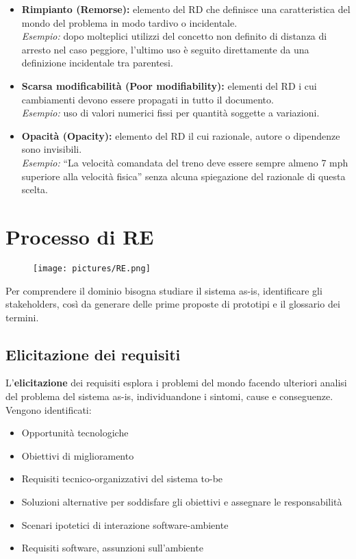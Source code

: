 \documentclass[../main.tex]{subfiles}
\begin{document}
\begin{itemize}
    \item \textbf{Rimpianto (Remorse):} elemento del RD che definisce una caratteristica del mondo del problema in modo tardivo o incidentale.\\
    \emph{Esempio:} dopo molteplici utilizzi del concetto non definito di distanza di arresto nel caso peggiore, l’ultimo uso è seguito direttamente da una definizione incidentale tra parentesi.
    
    \item \textbf{Scarsa modificabilità (Poor modifiability):} elementi del RD i cui cambiamenti devono essere propagati in tutto il documento.\\
    \emph{Esempio:} uso di valori numerici fissi per quantità soggette a variazioni.
    
    \item \textbf{Opacità (Opacity):} elemento del RD il cui razionale, autore o dipendenze sono invisibili.\\
    \emph{Esempio:} ``La velocità comandata del treno deve essere sempre almeno 7 mph superiore alla velocità fisica'' senza alcuna spiegazione del razionale di questa scelta.
\end{itemize}
\section{Processo di RE}
\begin{figure}[h]
    \centering
    \texttt{[image: pictures/RE.png]}
\end{figure} \noindent
Per comprendere il dominio bisogna studiare il sistema as-is, identificare gli stakeholders, così da generare delle prime proposte di prototipi e il glossario dei termini.
\subsection{Elicitazione dei requisiti}
L'\textbf{elicitazione} dei requisiti esplora i problemi del mondo facendo ulteriori analisi del problema del sistema as-is, individuandone i sintomi, cause e conseguenze.
Vengono identificati:
\begin{itemize}
	\item Opportunità tecnologiche
	\item Obiettivi di miglioramento
	\item Requisiti tecnico-organizzativi del sistema to-be
	\item Soluzioni alternative per soddisfare gli obiettivi e assegnare le responsabilità
	\item Scenari ipotetici di interazione software-ambiente
	\item Requisiti software, assunzioni sull'ambiente
\end{itemize}
\end{document}
